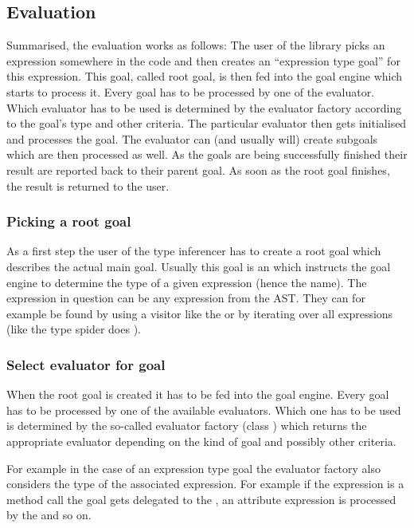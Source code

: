 \documentclass[12pt,halfparskip,DIV11,BCOR10mm]{scrreprt}
\begin{document}
\subsection{Evaluation}

Summarised, the evaluation works as follows: The user of the library picks an expression somewhere in the code and then creates an ``expression type goal'' for this expression. This goal, called root goal, is then fed into the goal engine which starts to process it. Every goal has to be processed by one of the evaluator. Which evaluator has to be used is determined by the evaluator factory according to the goal's type and other criteria. The particular evaluator then gets initialised and processes the goal. The evaluator can (and usually will) create subgoals which are then processed as well. As the goals are being successfully finished their result are reported back to their parent goal. As soon as the root goal finishes, the result is returned to the user.

\subsubsection{Picking a root goal}

As a first step the user of the type inferencer has to create a root goal which describes the actual main goal. Usually this goal is an  which instructs the goal engine to determine the type of a given expression (hence the name). The expression in question can be any expression from the AST. They can for example be found by using a visitor like the  or by iterating over all expressions (like the type spider does ).

\subsubsection{Select evaluator for goal}

When the root goal is created it has to be fed into the goal engine. Every goal has to be processed by one of the available evaluators. Which one has to be used is determined by the so-called evaluator factory (class ) which returns the appropriate evaluator depending on the kind of goal and possibly other criteria.

For example in the case of an expression type goal the evaluator factory also considers the type of the associated expression. For example if the expression is a method call the goal gets delegated to the , an attribute expression is processed by the  and so on.
\end{document}
